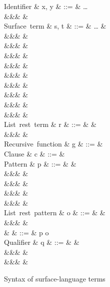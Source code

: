 \begin{figure}[H]
\begin{syntaxfig}
\mbox{Identifier}
&
x, y
&
::=
&
\ldots
\\
&&&
\primOp
&
\\
\mbox{Surface term}
&
s, t
&
::=
&
\ldots
&
\\
&&&
\exOp{\primOp}
&
\\
&&&
&
\\
&&&
&
\\
&&&
&
\\
&&&
&
\\
&&&
&
\\
&&&
&
\\
&&&
&
\\
&&&
&
\\[2mm]

\mbox{List rest term}
&
r
&
::=
&
\annListEnd{\alpha}
&
\\
&&&
&
\\[2mm]

\mbox{Recursive function}
&
g
&
::=
&
\\[2mm]

\mbox{Clause}
&
c
&
::=
&
\\[2mm]

\mbox{Pattern}
&
p
&
::=
&
&
\\
&&&
&
\\
&&&
\pattNil
&
\\
&&&
&
\\
&&&
&
\\[2mm]

\mbox{List rest pattern}
&
o
&
::=
&
\pattListEnd
&
\\
&&&
&
\\[2mm]

&
\pi
&
::=
&
p \mid o
\\[2mm]

\mbox{Qualifier}
&
q
&
::=
&
&
\\
&&&
&
\\
&&&
&
\end{syntaxfig}
\caption{Syntax of surface-language terms}
\end{figure}
